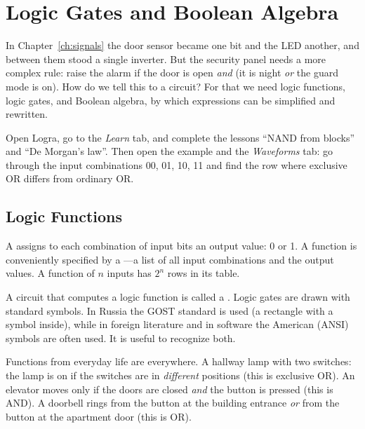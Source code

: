 \chapter{Logic Gates and Boolean Algebra}
\label{ch:gates}

In Chapter~\ref{ch:signals} the door sensor became one bit and the LED
another, and between them stood a single inverter. But the security panel needs a
more complex rule: raise the alarm if the door is open \emph{and} (it is night \emph{or}
the guard mode is on). How do we tell this to a circuit? For that we need logic
functions, logic gates, and Boolean algebra, by which expressions can be
simplified and rewritten.

\begin{buildbox}
Open Logra, go to the \emph{Learn} tab, and complete the lessons ``NAND from blocks'' and
``De Morgan's law''. Then open the  example and the
\emph{Waveforms} tab: go through the input combinations 00, 01, 10, 11 and find
the row where exclusive OR differs from ordinary OR.
\end{buildbox}

\section{Logic Functions}

A  assigns to each combination of input
bits an output value: 0 or 1. A function is conveniently specified by a ---a list of all input combinations and the output values. A function of
$n$ inputs has $2^n$ rows in its table.

A circuit that computes a logic function is called a
. Logic gates are drawn with
standard symbols. In Russia the GOST standard is used (a rectangle with a
symbol inside), while in foreign literature and in software the
American (ANSI) symbols are often used. It is useful to recognize both.

Functions from everyday life are everywhere. A hallway lamp with two
switches: the lamp is on if the switches are in \emph{different} positions
(this is exclusive OR). An elevator moves only if the doors are closed \emph{and} the
button is pressed (this is AND). A doorbell rings from the button at the building entrance \emph{or} from the button
at the apartment door (this is OR).

